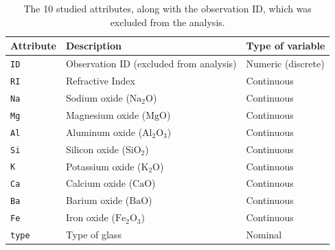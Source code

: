\documentclass[dtu]{dtuarticle}
\newcommand*\chem[1]{\ensuremath{\mathrm{#1}}}
\begin{document}
	\begin{table}
		\centering
		\begin{tabular}{l|l|l}
			\textbf{Attribute} & \textbf{Description}                    & \textbf{Type of variable} \\ \hline \hline
			\texttt{ID}        & Observation ID (excluded from analysis) & Numeric (discrete)        \\ \hline
			\texttt{RI}        & Refractive Index                        & Continuous                \\ \hline
			\texttt{Na}        & Sodium oxide ($\chem{Na_2 O}$)          & Continuous                \\ \hline
			\texttt{Mg}        & Magnesium oxide ($\chem{Mg O}$)         & Continuous                \\ \hline
			\texttt{Al}        & Aluminum oxide ($\chem{Al_2 O_3}$)      & Continuous                \\ \hline
			\texttt{Si}        & Silicon oxide ($\chem{Si O_2}$)         & Continuous                \\ \hline
			\texttt{K}         & Potassium oxide ($\chem{K_2 O}$)        & Continuous                \\ \hline
			\texttt{Ca}        & Calcium oxide ($\chem{Ca O }$)          & Continuous                \\ \hline
			\texttt{Ba}        & Barium oxide ($\chem{Ba O}$)            & Continuous                \\ \hline
			\texttt{Fe}        & Iron oxide ($\chem{Fe_2 O_3}$)          & Continuous                \\ \hline
			\texttt{type}      & Type of glass                           & Nominal                   \\
		\end{tabular}
		\caption{The 10 studied attributes, along with the observation ID, which was excluded from the analysis.}
		\label{table:attributes}
	\end{table}
\end{document}
